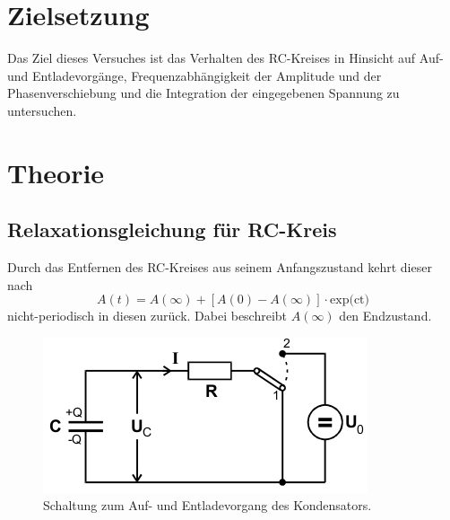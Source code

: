 \section{Zielsetzung}
Das Ziel dieses Versuches ist das Verhalten des RC-Kreises in Hinsicht auf
Auf- und Entladevorgänge, Frequenzabhängigkeit der Amplitude und der Phasenverschiebung
und die Integration der eingegebenen Spannung zu untersuchen.


\section{Theorie}
\subsection{Relaxationsgleichung für RC-Kreis}
Durch das Entfernen des RC-Kreises aus seinem Anfangszustand kehrt
dieser nach
\begin{equation}
  A(t) = A(\infty) + [A(0)- A(\infty)]\cdot \text{exp(ct)}
  \label{eqn:1}
\end{equation}
nicht-periodisch in diesen zurück. Dabei beschreibt $A(\infty)$ den Endzustand.

\begin{figure}[H]
  \centering
  \includegraphics{content/images/pic1.png}
  \caption{Schaltung zum Auf- und Entladevorgang des Kondensators.}
  \label{pic:1}
\end{figure}



